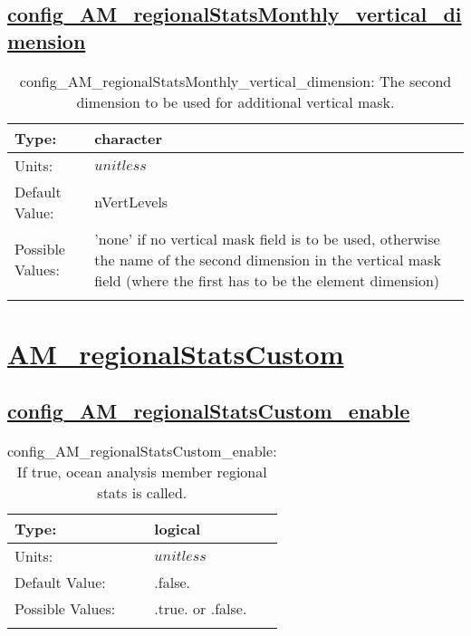 \subsection[config\_AM\_regionalStatsMonthly\_vertical\_dimension]{\hyperref[sec:nm_tab_AM_regionalStatsMonthly]{config\_AM\_regionalStatsMonthly\_vertical\_dimension}}
\label{subsec:nm_sec_config_AM_regionalStatsMonthly_vertical_dimension}
\begin{center}
\begin{longtable}{| p{2.0in} || p{4.0in} |}
    \hline
    Type: & character \\
    \hline
    Units: & $unitless$ \\
    \hline
    Default Value: & nVertLevels \\
    \hline
    Possible Values: & 'none' if no vertical mask field is to be used, otherwise the name of the second dimension in the vertical mask field (where the first has to be the element dimension) \\
    \hline
    \caption{config\_AM\_regionalStatsMonthly\_vertical\_dimension: The second dimension to be used for additional vertical mask.}
\end{longtable}
\end{center}
\section[AM\_regionalStatsCustom]{\hyperref[sec:nm_tab_AM_regionalStatsCustom]{AM\_regionalStatsCustom}}
\label{sec:nm_sec_AM_regionalStatsCustom}
\subsection[config\_AM\_regionalStatsCustom\_enable]{\hyperref[sec:nm_tab_AM_regionalStatsCustom]{config\_AM\_regionalStatsCustom\_enable}}
\label{subsec:nm_sec_config_AM_regionalStatsCustom_enable}
\begin{center}
\begin{longtable}{| p{2.0in} || p{4.0in} |}
    \hline
    Type: & logical \\
    \hline
    Units: & $unitless$ \\
    \hline
    Default Value: & .false. \\
    \hline
    Possible Values: & .true. or .false. \\
    \hline
    \caption{config\_AM\_regionalStatsCustom\_enable: If true, ocean analysis member regional stats is called.}
\end{longtable}
\end{center}
